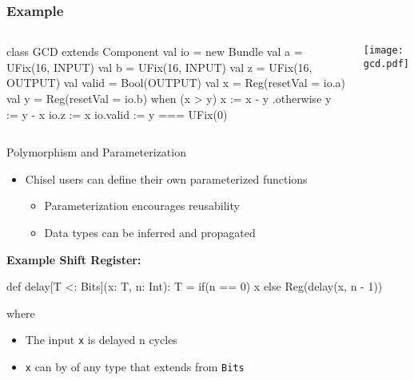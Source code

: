 \documentclass[xcolor=pdflatex,dvipsnames,table]{beamer}
\begin{document}
\begin{frame}[fragile]
\frametitle{Example}
\begin{columns}


\begin{footnotesize}
\begin{scala}
class GCD extends Component {
  val io = new Bundle {
    val a     = UFix(16, INPUT)
    val b     = UFix(16, INPUT)
    val z     = UFix(16, OUTPUT)
    val valid = Bool(OUTPUT) }
  val x = Reg(resetVal = io.a)
  val y = Reg(resetVal = io.b)
  when (x > y) {
    x := x - y
  } .otherwise {
    y := y - x
  }
  io.z     := x
  io.valid := y === UFix(0)
}
\end{scala}
\end{footnotesize}


\begin{center}
\texttt{[image: gcd.pdf]} 
\end{center}

\end{columns}
\end{frame}

\begin{frame}[fragile]{Polymorphism and Parameterization}
\begin{itemize}
\item Chisel users can define their own parameterized functions
\begin{itemize}
\item Parameterization encourages reusability
\item Data types can be inferred and propagated
\end{itemize}
\end{itemize}

\textbf{Example Shift Register:}
\begin{scala}
def delay[T <: Bits](x: T, n: Int): T = 
  if(n == 0) x else Reg(delay(x, n - 1))
\end{scala}
where
\begin{itemize}
\item The input \verb+x+ is delayed n cycles
\item \verb+x+ can by of any type that extends from \verb+Bits+
\end{itemize}

\end{frame}
\end{document}
